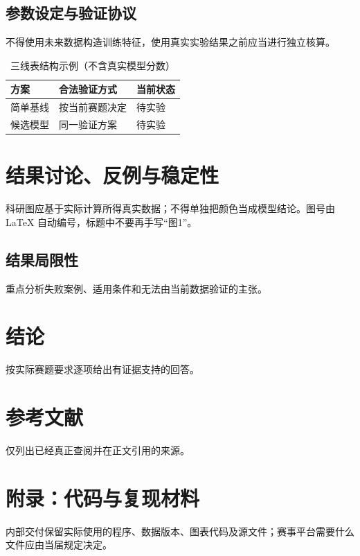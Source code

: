 \documentclass[UTF8,zihao=-4,a4paper]{ctexart}
\begin{document}
\subsection{参数设定与验证协议}
不得使用未来数据构造训练特征，使用真实实验结果之前应当进行独立核算。

\begin{table}[htbp]
\centering
\caption{三线表结构示例（不含真实模型分数）}
\small
\begin{tabular}{@{}lll@{}}
\toprule
方案 & 合法验证方式 & 当前状态\\
\midrule
简单基线 & 按当前赛题决定 & 待实验\\
候选模型 & 同一验证方案 & 待实验\\
\bottomrule
\end{tabular}
\end{table}

\section{结果讨论、反例与稳定性}
科研图应基于实际计算所得真实数据；不得单独把颜色当成模型结论。图号由 LaTeX 自动编号，标题中不要再手写“图1”。

\subsection{结果局限性}
重点分析失败案例、适用条件和无法由当前数据验证的主张。

\section{结论}
按实际赛题要求逐项给出有证据支持的回答。

\section*{参考文献}
仅列出已经真正查阅并在正文引用的来源。

\appendix
\section*{附录：代码与复现材料}
内部交付保留实际使用的程序、数据版本、图表代码及源文件；赛事平台需要什么文件应由当届规定决定。
\end{document}

